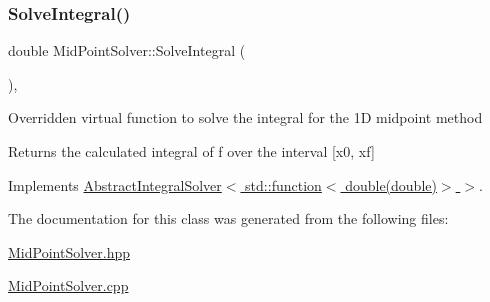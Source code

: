 \subsubsection{\texorpdfstring{Solve\+Integral()}{SolveIntegral()}}
{\footnotesize\ttfamily double Mid\+Point\+Solver\+::\+Solve\+Integral (\begin{DoxyParamCaption}{ }\end{DoxyParamCaption})\hspace{0.3cm}{\ttfamily [override]}, {\ttfamily [virtual]}}

Overridden virtual function to solve the integral for the 1D midpoint method \begin{DoxyReturn}{Returns}
the calculated integral of f over the interval \mbox{[}x0, xf\mbox{]} 
\end{DoxyReturn}


Implements \hyperlink{class_abstract_integral_solver_ad87cb44c5ef3122bc95be48f473ba399}{Abstract\+Integral\+Solver$<$ std\+::function$<$ double(double)$>$ $>$}.



The documentation for this class was generated from the following files\+:\begin{DoxyCompactItemize}
\item 
\hyperlink{_mid_point_solver_8hpp}{Mid\+Point\+Solver.\+hpp}\item 
\hyperlink{_mid_point_solver_8cpp}{Mid\+Point\+Solver.\+cpp}\end{DoxyCompactItemize}
